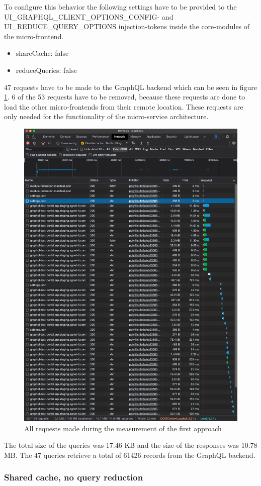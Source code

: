  To configure this behavior the following settings have to be provided to the UI\_GRAPHQL\_CLIENT\_OPTIONS\_CONFIG- and UI\_REDUCE\_QUERY\_OPTIONS injection-tokens inside the core-modules of the micro-frontend.

\begin{itemize}
    \item shareCache: false
    \item reduceQueries: false
\end{itemize}

47 requests have to be made to the GraphQL backend which can be seen in figure \ref{figure:results:no-shared-cache-no-reduction-chrome-dev-tools}. 6 of the 53 requests have to be removed, because these requests are done to load the other micro-frontends from their remote location. These requests are only needed for the functionality of the micro-service architecture.

\ifshowImages
\begin{figure}[H]
\centering
\includegraphics[width=0.6\linewidth]{images/1-attempt/no-shared-cache-no-reduction.png}
\caption{All requests made during the measurement of the first approach}\label{figure:results:no-shared-cache-no-reduction-chrome-dev-tools}
\end{figure}
\fi

The total size of the queries was 17.46 KB and the size of the responses was 10.78 MB. The 47 queries retrieve a total of 61426 records from the GraphQL backend.

\subsubsection{Shared cache, no query reduction}

